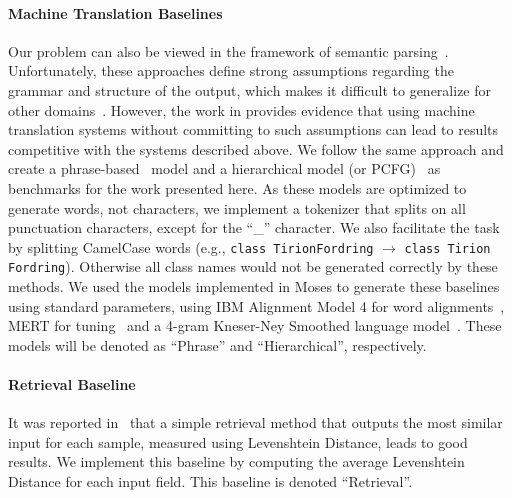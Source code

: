 \documentclass[11pt]{article}
\begin{document}
\paragraph{Machine Translation Baselines} Our problem can also be viewed in the
framework of semantic
parsing~\cite{Wong:2006:LSP:1220835.1220891,Lu:2008:GMP:1613715.1613815,Jones:2012:SPB:2390524.2390593,artzi-lee-zettlemoyer:2015:EMNLP}.
Unfortunately, these approaches define strong assumptions regarding the grammar and
structure of the output, which makes it difficult to generalize for other
domains~\cite{Kwiatkowski:2010:IPC:1870658.1870777}.
However, the work in  provides evidence
that using machine translation systems without committing to such assumptions
can lead to results competitive with the systems described above.  We follow the
same approach and create a
phrase-based~\cite{Koehn:2007:MOS:1557769.1557821} model and a hierarchical
model (or PCFG)~\cite{Chiang:2007:HPT:1268656.1268659} as benchmarks for the
work presented here.
As these models are optimized to generate words, not characters, we
implement a tokenizer that splits on all punctuation characters, except for
the ``\_'' character. We also facilitate the task by splitting CamelCase words
(e.g., \texttt{class TirionFordring} $\to$ \texttt{class Tirion Fordring}). Otherwise all
class names would not be generated correctly by these methods. We used the models implemented in
Moses to generate these baselines using standard parameters, using IBM Alignment
Model 4 for word alignments~\cite{Och:2003:SCV:778822.778824}, MERT for
tuning~\cite{Sokolov11minimum} and a 4-gram Kneser-Ney Smoothed language
model~\cite{citeulike:13570576}. These models will be denoted as ``Phrase'' and
``Hierarchical'', respectively.



\paragraph{Retrieval Baseline} It was reported in~\cite{quirk:acl15} that a
simple retrieval method that outputs the most similar input for each sample, measured
using Levenshtein Distance, leads to good results.
We implement this baseline by computing the average Levenshtein Distance for each input field.
This baseline is denoted ``Retrieval''.
\end{document}
